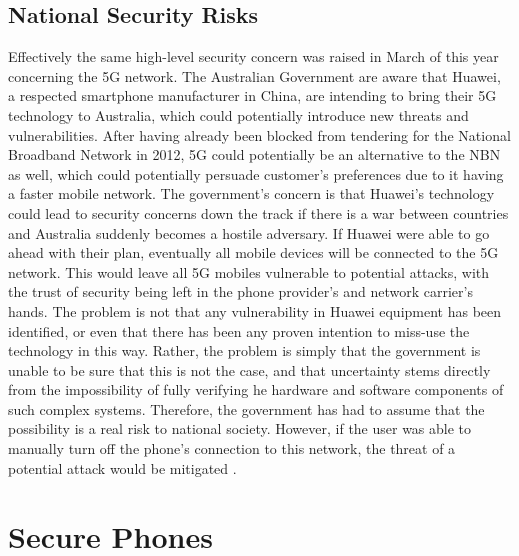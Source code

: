 
\subsection{National Security Risks}

	Effectively the same high-level security concern was raised in March of this year concerning the 5G network. The Australian Government are aware that Huawei, a respected smartphone manufacturer in China, are intending to bring their 5G technology to Australia, which could potentially introduce new threats and vulnerabilities. After having already been blocked from tendering for the National Broadband Network in 2012, 5G could potentially be an alternative to the NBN as well, which could potentially persuade customer’s preferences due to it having a faster mobile network. 
	The government’s concern is that Huawei’s technology could lead to security concerns down the track if there is a war between countries and Australia suddenly becomes a hostile adversary. If Huawei were able to go ahead with their plan, eventually all mobile devices will be connected to the 5G network. This would leave all 5G mobiles vulnerable to potential attacks, with the trust of security being left in the phone provider’s and network carrier’s hands. The problem is not that any vulnerability in Huawei equipment has been identified, or even that there has been any proven intention to miss-use the technology in this way. Rather, the problem is simply that the government is unable to be sure that this is not the case, and that uncertainty stems directly from the impossibility of fully verifying he hardware and software components of such complex systems. Therefore, the government has had to assume that the possibility is a real risk to national society.
However, if the user was able to manually turn off the phone’s connection to this network, the threat of a potential attack would be mitigated \cite{RN14}.


\section{Secure Phones}

